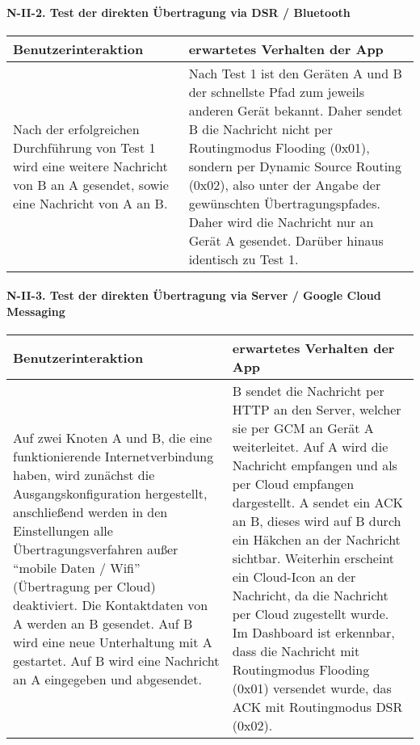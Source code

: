 \paragraph{N-II-2. Test der direkten Übertragung via DSR /
Bluetooth}\label{test-der-direkten-uxfcbertragung-via-dsr-bluetooth}

\begin{longtable}{p{8cm}p{8.5cm}}
\toprule
Benutzerinteraktion & erwartetes Verhalten der App\tabularnewline
\midrule
\endhead
Nach der erfolgreichen Durchführung von Test 1 wird eine weitere
Nachricht von B an A gesendet, sowie eine Nachricht von A an B. & Nach
Test 1 ist den Geräten A und B der schnellste Pfad zum jeweils anderen
Gerät bekannt. Daher sendet B die Nachricht nicht per Routingmodus
Flooding (0x01), sondern per Dynamic Source Routing (0x02), also unter
der Angabe der gewünschten Übertragungspfades. Daher wird die Nachricht
nur an Gerät A gesendet. Darüber hinaus identisch zu Test
1.\tabularnewline
\bottomrule
\end{longtable}

\paragraph{N-II-3. Test der direkten Übertragung via Server / Google Cloud
Messaging}\label{test-der-direkten-uxfcbertragung-via-server-google-cloud-messaging}

\begin{longtable}{p{8cm}p{8.5cm}}
\toprule
Benutzerinteraktion & erwartetes Verhalten der App\tabularnewline
\midrule
\endhead
Auf zwei Knoten A und B, die eine funktionierende Internetverbindung
haben, wird zunächst die Ausgangskonfiguration hergestellt, anschließend
werden in den Einstellungen alle Übertragungsverfahren außer ``mobile
Daten / Wifi'' (Übertragung per Cloud) deaktiviert. Die Kontaktdaten von
A werden an B gesendet. Auf B wird eine neue Unterhaltung mit A
gestartet. Auf B wird eine Nachricht an A eingegeben und abgesendet. & B
sendet die Nachricht per HTTP an den Server, welcher sie per GCM an
Gerät A weiterleitet. Auf A wird die Nachricht empfangen und als per
Cloud empfangen dargestellt. A sendet ein ACK an B, dieses wird auf B
durch ein Häkchen an der Nachricht sichtbar. Weiterhin erscheint ein
Cloud-Icon an der Nachricht, da die Nachricht per Cloud zugestellt
wurde. Im Dashboard ist erkennbar, dass die Nachricht mit Routingmodus
Flooding (0x01) versendet wurde, das ACK mit Routingmodus DSR
(0x02).\tabularnewline
\bottomrule
\end{longtable}


